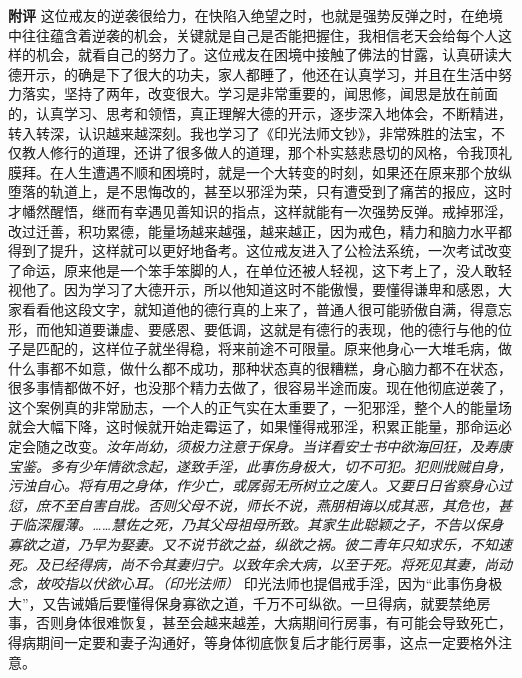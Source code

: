 \begin{case}
    \textbf{附评} 这位戒友的逆袭很给力，在快陷入绝望之时，也就是强势反弹之时，在绝境中往往蕴含着逆袭的机会，关键就是自己是否能把握住，我相信老天会给每个人这样的机会，就看自己的努力了。这位戒友在困境中接触了佛法的甘露，认真研读大德开示，的确是下了很大的功夫，家人都睡了，他还在认真学习，并且在生活中努力落实，坚持了两年，改变很大。学习是非常重要的，闻思修，闻思是放在前面的，认真学习、思考和领悟，真正理解大德的开示，逐步深入地体会，不断精进，转入转深，认识越来越深刻。我也学习了《印光法师文钞》，非常殊胜的法宝，不仅教人修行的道理，还讲了很多做人的道理，那个朴实慈悲恳切的风格，令我顶礼膜拜。在人生遭遇不顺和困境时，就是一个大转变的时刻，如果还在原来那个放纵堕落的轨道上，是不思悔改的，甚至以邪淫为荣，只有遭受到了痛苦的报应，这时才幡然醒悟，继而有幸遇见善知识的指点，这样就能有一次强势反弹。戒掉邪淫，改过迁善，积功累德，能量场越来越强，越来越正，因为戒色，精力和脑力水平都得到了提升，这样就可以更好地备考。这位戒友进入了公检法系统，一次考试改变了命运，原来他是一个笨手笨脚的人，在单位还被人轻视，这下考上了，没人敢轻视他了。因为学习了大德开示，所以他知道这时不能傲慢，要懂得谦卑和感恩，大家看看他这段文字，就知道他的德行真的上来了，普通人很可能骄傲自满，得意忘形，而他知道要谦虚、要感恩、要低调，这就是有德行的表现，他的德行与他的位子是匹配的，这样位子就坐得稳，将来前途不可限量。原来他身心一大堆毛病，做什么事都不如意，做什么都不成功，那种状态真的很糟糕，身心脑力都不在状态，很多事情都做不好，也没那个精力去做了，很容易半途而废。现在他彻底逆袭了，这个案例真的非常励志，一个人的正气实在太重要了，一犯邪淫，整个人的能量场就会大幅下降，这时候就开始走霉运了，如果懂得戒邪淫，积累正能量，那命运必定会随之改变。\textit{汝年尚幼，须极力注意于保身。当详看安士书中欲海回狂，及寿康宝鉴。多有少年情欲念起，遂致手淫，此事伤身极大，切不可犯。犯则戕贼自身，污浊自心。将有用之身体，作少亡，或孱弱无所树立之废人。又要日日省察身心过愆，庶不至自害自戕。否则父母不说，师长不说，燕朋相诲以成其恶，其危也，甚于临深履薄。……慧佐之死，乃其父母祖母所致。其家生此聪颖之子，不告以保身寡欲之道，乃早为娶妻。又不说节欲之益，纵欲之祸。彼二青年只知求乐，不知速死。及已经得病，尚不令其妻归宁。以致年余大病，以至于死。将死见其妻，尚动念，故咬指以伏欲心耳。（印光法师）} 印光法师也提倡戒手淫，因为“此事伤身极大”，又告诫婚后要懂得保身寡欲之道，千万不可纵欲。一旦得病，就要禁绝房事，否则身体很难恢复，甚至会越来越差，大病期间行房事，有可能会导致死亡，得病期间一定要和妻子沟通好，等身体彻底恢复后才能行房事，这点一定要格外注意。
\end{case}


